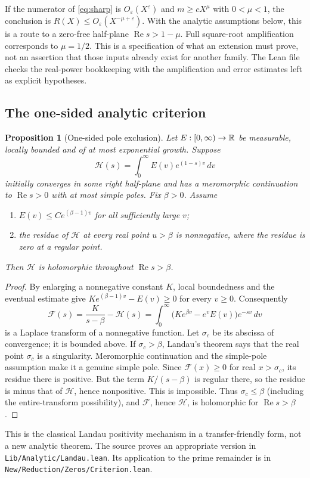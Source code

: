 \documentclass[11pt,letterpaper]{article}
\newtheorem{proposition}[theorem]{Proposition}
\theoremstyle{definition}\newtheorem{definition}[theorem]{Definition}
\theoremstyle{remark}\newtheorem{remark}[theorem]{Remark}
\newcommand{\re}{\operatorname{Re}}\newcommand{\im}{\operatorname{Im}}
\newcommand{\src}[1]{\nolinkurl{#1}}
\begin{document}
If the numerator of \eqref{eq:sharp} is $O_\varepsilon(X^\varepsilon)$ and
$m\ge cX^\mu$ with $0<\mu<1$, the conclusion is
$R(X)\le O_\varepsilon(X^{-\mu+\varepsilon})$.
With the analytic assumptions below, this is a route to a zero-free half-plane
$\re s>1-\mu$. Full square-root amplification corresponds to $\mu=1/2$.
This is a specification of what an extension must prove, not an assertion that those
inputs already exist for another family. The Lean file checks the real-power bookkeeping
with the amplification and error estimates left as explicit hypotheses.

\subsection{The one-sided analytic criterion}
\begin{proposition}[One-sided pole exclusion]\label{prop:landau}
Let $E:[0,\infty)\to\mathbb R$ be measurable, locally bounded and of at most exponential growth.
Suppose
\[
 \mathcal H(s)=\int_0^\infty E(v)e^{(1-s)v}\,dv
\]
initially converges in some right half-plane and has a meromorphic continuation to
$\re s>0$ with at most simple poles. Fix $\beta>0$. Assume
\begin{enumerate}
\item $E(v)\le C e^{(\beta-1)v}$ for all sufficiently large $v$;
\item the residue of $\mathcal H$ at every real point $u>\beta$ is nonnegative,
where the residue is zero at a regular point.
\end{enumerate}
Then $\mathcal H$ is holomorphic throughout $\re s>\beta$.
\end{proposition}
\begin{proof}
By enlarging a nonnegative constant $K$, local boundedness and the eventual estimate give
$K e^{(\beta-1)v}-E(v)\ge0$ for every $v\ge0$. Consequently
\[
 \mathcal F(s)=\frac K{s-\beta}-\mathcal H(s)
 =\int_0^\infty\bigl(K e^{\beta v}-e^v E(v)\bigr)e^{-sv}\,dv
\]
is a Laplace transform of a nonnegative function. Let $\sigma_c$ be its abscissa of
convergence; it is bounded above. If $\sigma_c>\beta$, Landau's theorem says that the
real point $\sigma_c$ is a singularity. Meromorphic continuation and the simple-pole
assumption make it a genuine simple pole. Since $\mathcal F(x)\ge0$ for real
$x>\sigma_c$, its residue there is positive. But the term $K/(s-\beta)$ is regular
there, so the residue is minus that of $\mathcal H$, hence nonpositive. This is impossible.
Thus $\sigma_c\le\beta$ (including the entire-transform possibility), and
$\mathcal F$, hence $\mathcal H$, is holomorphic for $\re s>\beta$.
\end{proof}
This is the classical Landau positivity mechanism in a transfer-friendly form, not a new
analytic theorem. The source proves an appropriate version in
\src{Lib/Analytic/Landau.lean}. Its application to the prime remainder is in
\src{New/Reduction/Zeros/Criterion.lean}.\cite{landau,criterion}
\end{document}
